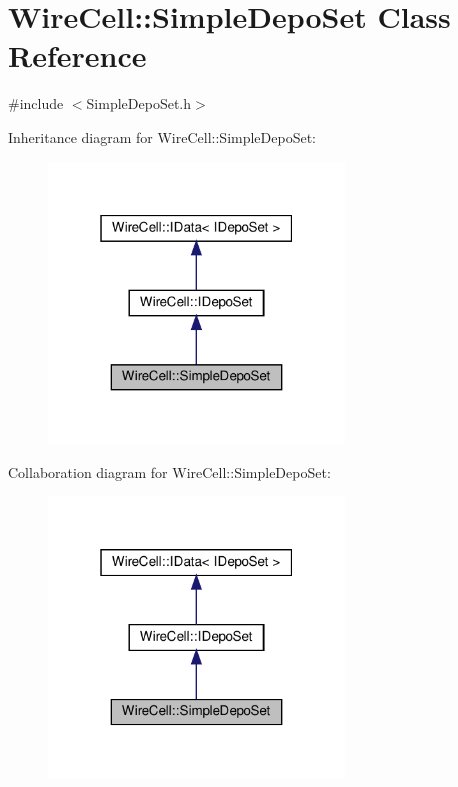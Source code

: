 \hypertarget{class_wire_cell_1_1_simple_depo_set}{}\section{Wire\+Cell\+:\+:Simple\+Depo\+Set Class Reference}
\label{class_wire_cell_1_1_simple_depo_set}


{\ttfamily \#include $<$Simple\+Depo\+Set.\+h$>$}



Inheritance diagram for Wire\+Cell\+:\+:Simple\+Depo\+Set\+:
\nopagebreak
\begin{figure}[H]
\begin{center}
\leavevmode
\includegraphics[width=223pt]{class_wire_cell_1_1_simple_depo_set__inherit__graph}
\end{center}
\end{figure}


Collaboration diagram for Wire\+Cell\+:\+:Simple\+Depo\+Set\+:
\nopagebreak
\begin{figure}[H]
\begin{center}
\leavevmode
\includegraphics[width=223pt]{class_wire_cell_1_1_simple_depo_set__coll__graph}
\end{center}
\end{figure}
